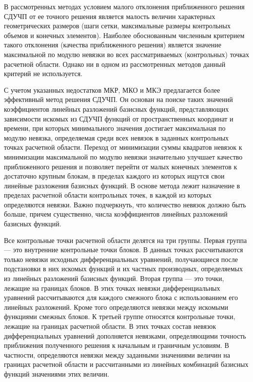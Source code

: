 \documentclass[a4paper,12pt]{article}
\begin{document}
В рассмотренных методах условием малого отклонения приближенного решения
СДУЧП от ее точного решения является малость величин характерных
геометрических размеров (шаги сетки, максимальные размеры контрольных
объемов и конечных элементов). Наиболее обоснованным численным критерием
такого отклонения (качества приближенного решения) является значение
максимальной по модулю невязки во всех рассматриваемых (контрольных) точках
расчетной области. Однако ни в одном из рассмотренных методов данный
критерий не используется. 

С учетом указанных недостатков МКР, МКО и МКЭ предлагается более
эффективный метод решения СДУЧП. Он основан на поиске таких значений
коэффициентов линейных разложений базисных функций, представляющих
зависимости искомых из СДУЧП функций от пространственных координат и
времени, при которых минимального значения достигает максимальная по модулю
невязка, определяемая среди всех невязок в заданных контрольных точках
расчетной области. Переход от минимизации суммы квадратов невязок к
минимизации максимальной по модулю невязки значительно улучшает качество
приближенного решения и позволяет перейти от малых конечных элементов к
достаточно крупным блокам, в пределах каждого из которых ищутся свои
линейные разложения базисных функций. В основе метода лежит назначение в
пределах расчетной области контрольных точек, в каждой из которых
определяются невязки. Важно подчеркнуть, что количество невязок должно быть
больше, причем существенно, числа коэффициентов линейных разложений
базисных функций.

Все контрольные точки расчетной области делятся на три группы. Первая
группа — это внутренние контрольные точки блоков. В данных точках
рассчитываются только невязки исходных дифференциальных уравнений,
получающиеся после подстановки в них искомых функций и их частных
производных, определяемых из линейных разложений базисных функций. Вторая
группа — это точки, лежащие на границах блоков. В этих точках невязки
дифференциальных уравнений рассчитываются для каждого смежного блока с
использованием его линейных разложений. Кроме того определяются невязки
между искомыми функциями смежных блоков. К третьей группе относятся
контрольные точки, лежащие на границах расчетной области. В этих точках
состав невязок дифференциальных уравнений дополняется невязками,
определяющими точность приближения полученного решения к начальным и
граничным условиям. В частности, определяются невязки между заданными
значениями величин на границах расчетной области и рассчитанными из
линейных комбинаций базисных функций значениями этих величин.
\end{document}
